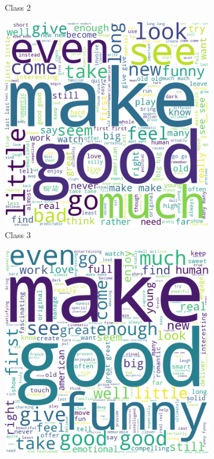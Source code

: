 \documentclass[10pt, a4paper]{article}
\begin{document}
\begin{figure}[h]
\begin{subfigure}[b]{0.18\textwidth}
         \caption{Class 2}
         \label{fig:class2cloud}
     \end{subfigure}
     \hfill
     \begin{subfigure}[b]{0.18\textwidth}
         \centering
         \includegraphics[width=\textwidth]{keywords3.png}
         \caption{Class 3}
         \label{fig:class3cloud}
     \end{subfigure}
     \hfill
     \begin{subfigure}[b]{0.18\textwidth}
         \centering
         \includegraphics[width=\textwidth]{keywords4.png}

\end{subfigure}
\end{figure}
\end{document}
